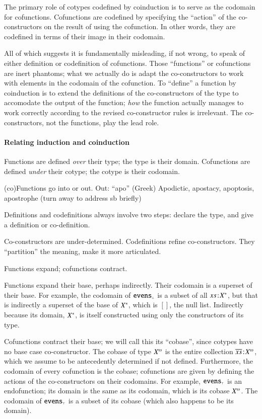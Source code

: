 The primary role of cotypes codefined by coinduction is to serve as
the codomain for cofunctions. Cofunctions are codefined by specifying
the ``action'' of the co-constructors on the result of using the
cofunction. In other words, they are codefined in terms of their image
in their codomain.

All of which suggests it is fundamentally misleading, if not wrong, to
speak of either definition or codefinition of cofunctions. Those
``functions'' or cofunctions are inert phantoms; what we actually do
is adapt the co-constructors to work with elements in the codomain of
the cofunction. To ``define'' a function by coinduction is to extend
the definitions of the co-constructors of the type to accomodate the
output of the function; \textit{how} the function actually manages to
work correctly according to the revised co-constructor rules is
irrelevant. The co-constructors, not the functions, play the lead
role.

\paragraph{Relating induction and coinduction}

Functions are defined \textit{over} their type; the type is their
domain. Cofunctions are defined \textit{under} their cotype; the
cotype is their codomain.

(co)Functions go into or out. Out: ``apo'' (Greek) Apodictic,
apostacy, apoptosis, apostrophe (turn away to address sb briefly)

Definitions and codefinitions always involve two steps: declare the
type, and give a definition or co-definition.

Co-constructors are under-determined. Codefinitions refine
co-constructors. They ``partition'' the meaning, make it more
articulated.

Functions expand; cofunctions contract.

Functions expand their base, perhaps indirectly. Their codomain is a
superset of their base. For example, the codomain of \(\texttt{\upshape evens}_{\scriptscriptstyle\bot}\)
is a subset of all \(xs\hspace{1pt}\mathpunct{:}\hspace{-1pt}{X^{*}}\), but that is indirectly
a superset of the base of \({X^{*}}\), which is \([]\), the null
list. Indirectly because its domain, \({X^{*}}\), is itself
constructed using only the constructors of its type.

Cofunctions contract their base; we will call this its ``cobase'',
since cotypes have no base case co-constructor. The cobase of type
\(\colist{X}\) is the entire collection
\(\tj{\coseq{x}}{\colist{X}}\), which we assume to be antecedently
determined if not defined. Furthermore, the codomain of every
cofunction is the cobase; cofunctions are given by defining the
actions of the co-constructors on their codomains. For example,
\(\texttt{\upshape evens}_{\scriptscriptstyle\top}\) is an endofunction; its domain is the same as its
codomain, which is its cobase \(\colist{X}\). The codomain of
\(\texttt{\upshape evens}_{\scriptscriptstyle\top}\) is a subset of its cobase (which also happens to be
its domain).

